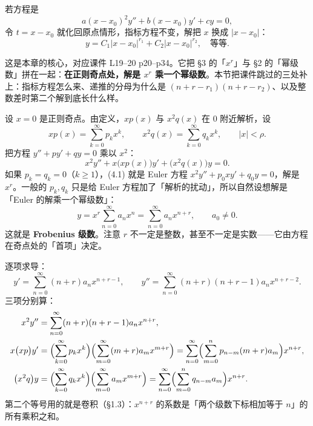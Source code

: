 \documentclass[11pt]{ctexart}
\begin{document}

若方程是
\[
a(x-x_0)^2y''+b(x-x_0)y'+cy=0,
\]
令 $t=x-x_0$ 就化回原点情形，指标方程不变，解把 $x$ 换成 $|x-x_0|$：
\[
y=C_1|x-x_0|^{r_1}+C_2|x-x_0|^{r_2},\quad\text{等等}.
\]



这是本章的核心，对应课件 L19--20 p20--p34。它把 §3 的「$x^r$」与 §2 的「幂级数」拼在一起：\textbf{在正则奇点处，解是 $x^r$ 乘一个幂级数}。本节把课件跳过的三处补上：指标方程怎么来、递推的分母为什么是 $(n+r-r_1)(n+r-r_2)$、以及整数差时第二个解到底长什么样。


设 $x=0$ 是正则奇点。由定义，$xp(x)$ 与 $x^2q(x)$ 在 $0$ 附近解析，设
\[
xp(x)=\sum_{k=0}^{\infty}p_kx^k,\qquad x^2q(x)=\sum_{k=0}^{\infty}q_kx^k,\qquad |x|<\rho .
\]
把方程 $y''+py'+qy=0$ 乘以 $x^2$：
\[
x^2y''+x\bigl(xp(x)\bigr)y'+\bigl(x^2q(x)\bigr)y=0 . \tag{4.1}
\]
如果 $p_k=q_k=0$（$k\geq1$），(4.1) 就是 Euler 方程 $x^2y''+p_0xy'+q_0y=0$，解是 $x^r$。一般的 $p_k,q_k$ 只是给 Euler 方程加了「解析的扰动」，所以自然设想解是「Euler 的解乘一个幂级数」：
\[
y=x^r\sum_{n=0}^{\infty}a_nx^n=\sum_{n=0}^{\infty}a_nx^{n+r},\qquad a_0\neq0 .
\]
这就是 \textbf{Frobenius 级数}。注意 $r$ 不一定是整数，甚至不一定是实数——它由方程在奇点处的「首项」决定。


逐项求导：
\[
y'=\sum_{n=0}^{\infty}(n+r)a_nx^{n+r-1},\qquad
y''=\sum_{n=0}^{\infty}(n+r)(n+r-1)a_nx^{n+r-2}.
\]
三项分别算：
\begin{align*}
x^2y''&=\sum_{n=0}^{\infty}(n+r)(n+r-1)a_nx^{n+r},\\
x\bigl(xp\bigr)y'&=\Bigl(\sum_{k=0}^{\infty}p_kx^k\Bigr)\Bigl(\sum_{m=0}^{\infty}(m+r)a_mx^{m+r}\Bigr)
=\sum_{n=0}^{\infty}\Bigl(\sum_{m=0}^{n}p_{n-m}(m+r)a_m\Bigr)x^{n+r},\\
\bigl(x^2q\bigr)y&=\Bigl(\sum_{k=0}^{\infty}q_kx^k\Bigr)\Bigl(\sum_{m=0}^{\infty}a_mx^{m+r}\Bigr)
=\sum_{n=0}^{\infty}\Bigl(\sum_{m=0}^{n}q_{n-m}a_m\Bigr)x^{n+r}.
\end{align*}
第二个等号用的就是卷积（§1.3）：$x^{n+r}$ 的系数是「两个级数下标相加等于 $n$」的所有乘积之和。
\end{document}

